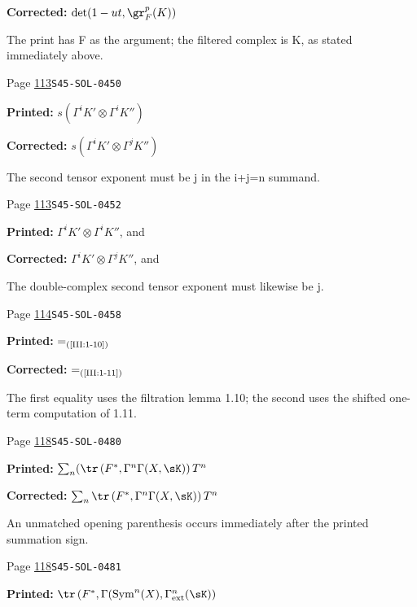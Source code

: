 \begin{description}
\par\noindent\textbf{Corrected:} \(\det(1-u t,\gr_F^p(K))\)
\par\noindent The print has F as the argument; the filtered complex is K, as stated immediately above.
\smallskip
\item[\hypertarget{apparatus:EN-0047}{47}] Page \hyperlink{printpage:en:113}{113}\quad\texttt{S45-SOL-0450}
\par\noindent\textbf{Printed:} \(s(\Gamma^i K'\otimes \Gamma^i K'')\)
\par\noindent\textbf{Corrected:} \(s(\Gamma^i K'\otimes \Gamma^j K'')\)
\par\noindent The second tensor exponent must be j in the i+j=n summand.
\smallskip
\item[\hypertarget{apparatus:EN-0048}{48}] Page \hyperlink{printpage:en:113}{113}\quad\texttt{S45-SOL-0452}
\par\noindent\textbf{Printed:} $\Gamma^i K'\otimes \Gamma^i K''$, and
\par\noindent\textbf{Corrected:} $\Gamma^i K'\otimes \Gamma^j K''$, and
\par\noindent The double-complex second tensor exponent must likewise be j.
\smallskip
\item[\hypertarget{apparatus:EN-0049}{49}] Page \hyperlink{printpage:en:114}{114}\quad\texttt{S45-SOL-0458}
\par\noindent\textbf{Printed:} \(=_{\text{(\ref{III:1-10})}}\)
\par\noindent\textbf{Corrected:} \(=_{\text{(\ref{III:1-11})}}\)
\par\noindent The first equality uses the filtration lemma 1.10; the second uses the shifted one-term computation of 1.11.
\smallskip
\item[\hypertarget{apparatus:EN-0050}{50}] Page \hyperlink{printpage:en:118}{118}\quad\texttt{S45-SOL-0480}
\par\noindent\textbf{Printed:} \(\sum_n (\tr\left(F^*,\Gamma^n \Gamma(X,\sK)\right) T^n\)
\par\noindent\textbf{Corrected:} \(\sum_n \tr\left(F^*,\Gamma^n \Gamma(X,\sK)\right) T^n\)
\par\noindent An unmatched opening parenthesis occurs immediately after the printed summation sign.
\smallskip
\item[\hypertarget{apparatus:EN-0051}{51}] Page \hyperlink{printpage:en:118}{118}\quad\texttt{S45-SOL-0481}
\par\noindent\textbf{Printed:} \(\tr\left(F^*,\Gamma(\operatorname{Sym}^n(X),\Gamma_\text{ext}^n(\sK)\right)\)

\end{description}
